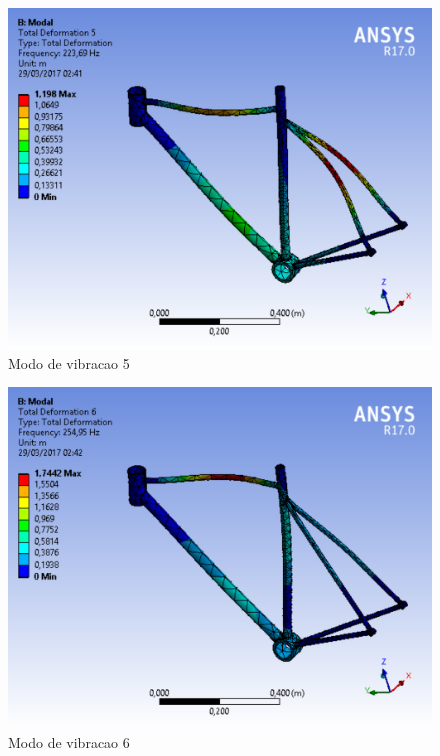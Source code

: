 \graphicspath{{figuras/}}
	\begin{figure}[h!]
	\centering
	\includegraphics[scale=0.80]{modo_de_vibracao_5.png}
	\caption{Modo de vibracao 5}
	\label{img:modo_de_vibracao5}
	\end{figure}	

\graphicspath{{figuras/}}
	\begin{figure}[h!]
	\centering
	\includegraphics[scale=0.80]{modo_de_vibracao_6.png}
	\caption{Modo de vibracao 6}
	\label{img:modo_de_vibracao 6}
	\end{figure}	

